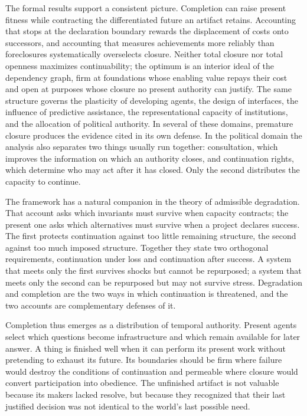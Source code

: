 The formal results support a consistent picture. Completion can raise present fitness while contracting the differentiated future an artifact retains. Accounting that stops at the declaration boundary rewards the displacement of costs onto successors, and accounting that measures achievements more reliably than foreclosures systematically overselects closure. Neither total closure nor total openness maximizes continuability; the optimum is an interior ideal of the dependency graph, firm at foundations whose enabling value repays their cost and open at purposes whose closure no present authority can justify. The same structure governs the plasticity of developing agents, the design of interfaces, the influence of predictive assistance, the representational capacity of institutions, and the allocation of political authority. In several of these domains, premature closure produces the evidence cited in its own defense. In the political domain the analysis also separates two things usually run together: consultation, which improves the information on which an authority closes, and continuation rights, which determine who may act after it has closed. Only the second distributes the capacity to continue.

The framework has a natural companion in the theory of admissible degradation. That account asks which invariants must survive when capacity contracts; the present one asks which alternatives must survive when a project declares success. The first protects continuation against too little remaining structure, the second against too much imposed structure. Together they state two orthogonal requirements, continuation under loss and continuation after success. A system that meets only the first survives shocks but cannot be repurposed; a system that meets only the second can be repurposed but may not survive stress. Degradation and completion are the two ways in which continuation is threatened, and the two accounts are complementary defenses of it.

Completion thus emerges as a distribution of temporal authority. Present agents select which questions become infrastructure and which remain available for later answer. A thing is finished well when it can perform its present work without pretending to exhaust its future. Its boundaries should be firm where failure would destroy the conditions of continuation and permeable where closure would convert participation into obedience. The unfinished artifact is not valuable because its makers lacked resolve, but because they recognized that their last justified decision was not identical to the world's last possible need.
